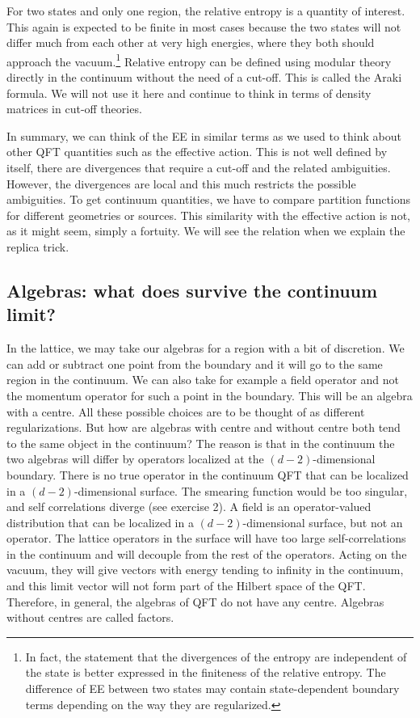 \documentclass[12pt]{article}
\numberwithin{equation}{section}
\begin{document}
For two states and only one region, the relative entropy is a quantity of interest. This again is expected to be finite in most cases because the two states will not differ much from each other at very high energies, where they both should approach the vacuum.\footnote{In fact, the statement that the divergences of the entropy are independent of the state is better expressed in the finiteness of the relative entropy. The difference of EE between two states may contain state-dependent boundary terms depending on the way they are regularized.} Relative entropy can be defined using modular theory directly in the continuum without the need of a cut-off. This is called the Araki formula. We will not use it here and continue to think in terms of density matrices in cut-off theories. 

In summary, we can think of the EE in similar terms as we used to think about other QFT quantities such as the effective action. This is not well defined by itself, there are divergences that require a cut-off and the related ambiguities. However, the divergences are local and this much restricts the possible ambiguities. To get continuum quantities, we have to compare partition functions for different geometries or sources. This similarity with the effective action is not, as it might seem, simply a fortuity. We will see the relation when we explain the replica trick.  

\subsection{Algebras: what does survive the continuum limit?}
In the lattice, we may take our algebras for a region with a bit of discretion. We can add or subtract one point from the boundary and it will go to the same region in the continuum. We can also take for example a field operator and not the momentum operator for such a point in the boundary. This will be an algebra with a centre. All these possible choices are to be thought of as different regularizations. But how are algebras with centre and without centre both tend to the same object in the continuum? The reason is that in the continuum the two algebras will differ by operators localized at the $(d-2)$-dimensional boundary.  There is no true operator in the continuum QFT that can be localized in a $(d-2)$-dimensional surface. The smearing function would be too singular, and self correlations diverge (see exercise 2). A field is an operator-valued distribution that can be localized in a $(d-2)$-dimensional surface, but not an operator. The lattice operators in the surface will have too large self-correlations in the continuum and will decouple from the rest of the operators. Acting on the vacuum, they will give vectors with energy tending to infinity in the continuum, and this limit vector will not form part of the Hilbert space of the QFT. Therefore, in general, the algebras of QFT do not have any centre. Algebras without centres are called factors. 
\end{document}

